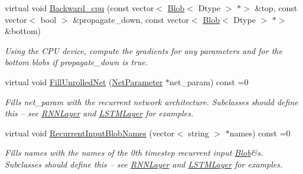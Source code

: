 \begin{DoxyCompactItemize}
\mbox{\label{classcaffe_1_1_recurrent_layer_a634f73d33c81cc8f8486659998ed45c6}} 
virtual void \mbox{\hyperlink{classcaffe_1_1_recurrent_layer_a634f73d33c81cc8f8486659998ed45c6}{Backward\+\_\+cpu}} (const vector$<$ \mbox{\hyperlink{classcaffe_1_1_blob}{Blob}}$<$ Dtype $>$ $\ast$$>$ \&top, const vector$<$ bool $>$ \&propagate\+\_\+down, const vector$<$ \mbox{\hyperlink{classcaffe_1_1_blob}{Blob}}$<$ Dtype $>$ $\ast$$>$ \&bottom)
\begin{DoxyCompactList}\small\item\em Using the C\+PU device, compute the gradients for any parameters and for the bottom blobs if propagate\+\_\+down is true. \end{DoxyCompactList}\item 
\mbox{\label{classcaffe_1_1_recurrent_layer_a04a3a032c4d0be559d88865a13a2d927}} 
virtual void \mbox{\hyperlink{classcaffe_1_1_recurrent_layer_a04a3a032c4d0be559d88865a13a2d927}{Fill\+Unrolled\+Net}} (\mbox{\hyperlink{classcaffe_1_1_net_parameter}{Net\+Parameter}} $\ast$net\+\_\+param) const =0
\begin{DoxyCompactList}\small\item\em Fills net\+\_\+param with the recurrent network architecture. Subclasses should define this -- see \mbox{\hyperlink{classcaffe_1_1_r_n_n_layer}{R\+N\+N\+Layer}} and \mbox{\hyperlink{classcaffe_1_1_l_s_t_m_layer}{L\+S\+T\+M\+Layer}} for examples. \end{DoxyCompactList}\item 
\mbox{\label{classcaffe_1_1_recurrent_layer_a9d9dab800f838e38651678718adfbbf6}} 
virtual void \mbox{\hyperlink{classcaffe_1_1_recurrent_layer_a9d9dab800f838e38651678718adfbbf6}{Recurrent\+Input\+Blob\+Names}} (vector$<$ string $>$ $\ast$names) const =0
\begin{DoxyCompactList}\small\item\em Fills names with the names of the 0th timestep recurrent input \mbox{\hyperlink{classcaffe_1_1_blob}{Blob}}\&s. Subclasses should define this -- see \mbox{\hyperlink{classcaffe_1_1_r_n_n_layer}{R\+N\+N\+Layer}} and \mbox{\hyperlink{classcaffe_1_1_l_s_t_m_layer}{L\+S\+T\+M\+Layer}} for examples. \end{DoxyCompactList}\item 
\mbox{\label{classcaffe_1_1_recurrent_layer_ad2c2427c11960e0b8961c31ff2f74c03}} 

\end{DoxyCompactItemize}
